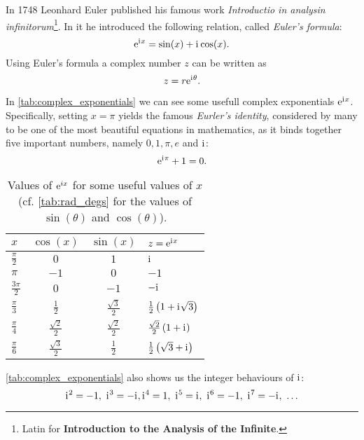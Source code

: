 In 1748 Leonhard Euler published his famous work \textit{Introductio in analysin infinitorum}\footnote{Latin for \textbf{Introduction to the Analysis of the Infinite}.}. In it he introduced the following relation, called \emph{Euler's formula}:
\begin{equation}
	\mathrm{e}^{\mathrm{i}\mkern1mu x} = \sin(x) + \mathrm{i}\mkern1mu\cos(x).
	\label{eq:Euler's_formula}
\end{equation}
Using Euler's formula a complex number $z$ can be written as
\begin{equation}
	z = r\mathrm{e}^{\mathrm{i}\mkern1mu\theta}.
	\label{eq:complex number using Eurler's formula}
\end{equation}

In \autoref{tab:complex_exponentials} we can see some usefull complex exponentials $\mathrm{e}^{\mathrm{i}\mkern1mu x}$. Specifically, setting $x=\pi$ yields the famous \emph{Eurler's identity}, considered by many to be one of the most beautiful equations in mathematics, as it binds together five important numbers, namely $0,1,\pi,e$ and $\mathrm{i}\mkern1mu$:
\begin{equation}
	\mathrm{e}^{\mathrm{i}\mkern1mu\pi} + 1 = 0.
	\label{eq:Euler's identity}
\end{equation}

\begin{table}
	\centering
	\caption{Values of $\mathrm{e}^{ix}$ for some useful values of $x$ (cf. \autoref{tab:rad_degs} for the values of $\sin(\theta)$ and $\cos(\theta)$).}
	\label{tab:complex_exponentials}
	\begin{tabular}{lccl}
		\toprule
		$x$ & $\cos(x)$ & $\sin(x)$ & $z=\mathrm{e}^{\mathrm{i}\mkern1mu x}$\\
		\midrule
		$\frac{\pi}{2}$ & $0$ & $1$ & $\mathrm{i}\mkern1mu$\\
		$\pi$ & $-1$ & $0$ & $-1$\\
		$\frac{3\pi}{2}$ & $0$ & $-1$ & $-\mathrm{i}\mkern1mu$\\
		$\frac{\pi}{3}$ & $\frac{1}{2}$ & $\frac{\sqrt{3}}{2}$ & $\frac{1}{2}\left( 1+\mathrm{i}\mkern1mu\sqrt{3} \right)$\\
		$\frac{\pi}{4}$ & $\frac{\sqrt{2}}{2}$ & $\frac{\sqrt{2}}{2}$ & $\frac{\sqrt{2}}{2}\left( 1+\mathrm{i}\mkern1mu \right)$\\
		$\frac{\pi}{6}$ & $\frac{\sqrt{3}}{2}$ & $\frac{1}{2}$ & $\frac{1}{2}\left( \sqrt{3}+\mathrm{i}\mkern1mu \right)$\\
		\bottomrule
	\end{tabular}
\end{table}

\autoref{tab:complex_exponentials} also shows us the integer behaviours of $\mathrm{i}\mkern1mu$:
\begin{equation}
	\iu^{2}=-1,\ \iu^{3}=-\iu, \iu^{4}=1,\ \iu^{5}=\iu,\ \iu^{6}=-1,\ \iu^{7}=-\iu,\ \dots
	\label{eq:powers of i}
\end{equation}

